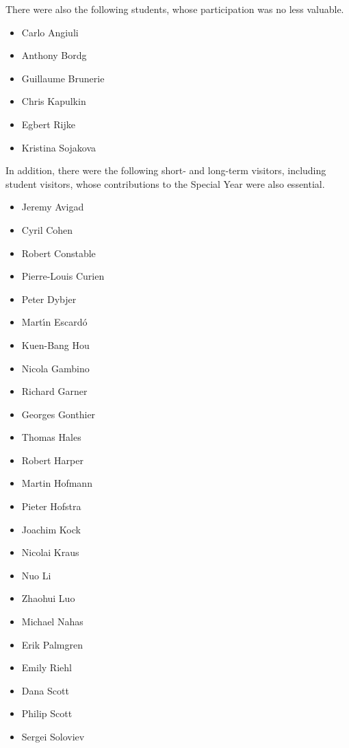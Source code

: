 \noindent There were also the following students, whose participation was no less valuable.

\begin{multicols}{3}{
\begin{itemize}
\item[] Carlo Angiuli
\item[] Anthony Bordg
\item[] Guillaume Brunerie
\item[] Chris Kapulkin
\item[] Egbert Rijke
\item[] Kristina Sojakova
\end{itemize}
}
\end{multicols}

\noindent In addition, there were the following short- and long-term visitors, including student visitors, whose contributions to the Special Year were also essential.

\begin{multicols}{3}{
\begin{itemize}
\item[] Jeremy Avigad
\item[] Cyril Cohen
\item[] Robert Constable
\item[] Pierre-Louis Curien
\item[] Peter Dybjer
\item[] Mart{\'\i}n Escard{\'o}
\item[] Kuen-Bang Hou
\item[] Nicola Gambino
\item[] Richard Garner
\item[] Georges Gonthier
\item[] Thomas Hales
\item[] Robert Harper
\item[] Martin Hofmann
\item[] Pieter Hofstra
\item[] Joachim Kock
\item[] Nicolai Kraus
\item[] Nuo Li
\item[] Zhaohui Luo
\item[] Michael Nahas
\item[] Erik Palmgren
\item[] Emily Riehl
\item[] Dana Scott
\item[] Philip Scott
\item[] Sergei Soloviev
\end{itemize}
}
\end{multicols}

